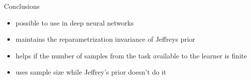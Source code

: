 \documentclass{beamer}
\begin{document}
\begin{frame}{Conclusions}


\begin{itemize}
\item possible to use in deep neural networks

\item maintains the reparametrization invariance of Jeffreys prior

\item helps if the number of samples
from the task available to the learner is finite

\item uses sample size while Jeffrey's prior doesn't do it
\end{itemize}

\end{frame}
\end{document}
